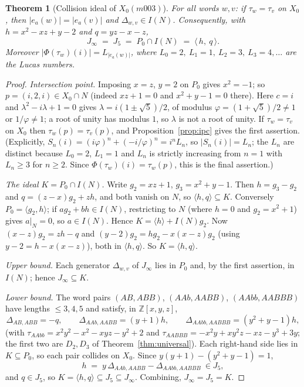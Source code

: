 \documentclass[11pt,a4paper]{article}
\newtheorem{theorem}{Theorem}[section]
\theoremstyle{definition}
\theoremstyle{remark}
\newcommand{\Z}{\mathbb{Z}}
\begin{document}
\begin{theorem}[Collision ideal of $X_0(m003)$]
\label{thm:collision}
For all words $w,v$: if $\tau_w=\tau_v$ on $X_0$, then
$|e_a(w)|=|e_a(v)|$ and $\Delta_{w,v}\in I(N)$. Consequently, with
$h=x^2-xz+y-2$ and $q=yz-x-z$,
\begin{equation}
J_\infty \;=\; J_5 \;=\; P_0\cap I(N) \;=\; \langle\, h,\ q\,\rangle .
\end{equation}
Moreover $|\Phi(\tau_w)(i)|=L_{|e_a(w)|}$, where $L_0=2,\ L_1=1,\ L_2=3,\
L_3=4,\dots$ are the Lucas numbers.
\end{theorem}

\begin{proof}
\emph{Intersection point.} Imposing $x=z$, $y=2$ on $P_0$ gives
$x^2=-1$; so $p=(i,2,i)\in X_0\cap N$ (indeed $xz+1=0$ and
$x^2+y-1=0$ there). Here $c=i$ and $\lambda^2-i\lambda+1=0$ gives
$\lambda=i(1\pm\sqrt5)/2$, of modulus $\varphi=(1+\sqrt5)/2\neq1$ or
$1/\varphi\neq1$; a root of unity has modulus $1$, so $\lambda$ is not a
root of unity. If $\tau_w=\tau_v$ on $X_0$ then $\tau_w(p)=\tau_v(p)$, and
Proposition~\ref{prop:ipc} gives the first assertion. (Explicitly,
$S_n(i)=(i\varphi)^n+(-i/\varphi)^n=i^nL_n$, so $|S_n(i)|=L_n$; the
$L_n$ are distinct because $L_0=2$, $L_1=1$ and $L_n$ is strictly
increasing from $n=1$ with $L_n\ge3$ for $n\ge2$. Since
$\Phi(\tau_w)(i)=\tau_w(p)$, this is the final assertion.)

\emph{The ideal $K=P_0\cap I(N)$.} Write $g_2=xz+1$, $g_3=x^2+y-1$.
Then $h=g_3-g_2$ and $q=(z-x)g_2+zh$, and both vanish on $N$, so
$\langle h,q\rangle\subseteq K$. Conversely $P_0=\langle g_2,h\rangle$; if
$ag_2+bh\in I(N)$, restricting to $N$ (where $h=0$ and $g_2=x^2+1$)
gives $a|_N=0$, so $a\in I(N)$. Hence
$K=\langle h\rangle+I(N)g_2$. Now $(x-z)g_2=zh-q$ and
$(y-2)g_2=hg_2-x(x-z)g_2$ (using $y-2=h-x(x-z)$), both in
$\langle h,q\rangle$. So $K=\langle h,q\rangle$.

\emph{Upper bound.} Each generator $\Delta_{w,v}$ of $J_\infty$ lies in
$P_0$ and, by the first assertion, in $I(N)$; hence $J_\infty\subseteq K$.

\emph{Lower bound.} The word pairs $(AB,ABB)$, $(AAb,AABB)$, $(AAbb,AABBB)$
have lengths $\le3,4,5$ and satisfy, in $\Z[x,y,z]$,
\begin{equation}
\Delta_{AB,ABB}=-q,\qquad
\Delta_{AAb,AABB}=(y+1)h,\qquad
\Delta_{AAbb,AABBB}=(y^2+y-1)h,
\end{equation}
(with $\tau_{AAbb}=x^2y^2-x^2-xyz-y^2+2$ and
$\tau_{AABBB}=-x^2y+xy^2z-xz-y^3+3y$; the first two are $D_2,D_3$ of
Theorem~\ref{thm:universal}). Each right-hand side lies in $K\subseteq
P_0$, so each pair collides on $X_0$. Since
$y(y+1)-(y^2+y-1)=1$,
\begin{equation}
h \;=\; y\,\Delta_{AAb,AABB}-\Delta_{AAbb,AABBB}\ \in J_5,
\end{equation}
and $q\in J_5$, so $K=\langle h,q\rangle\subseteq J_5\subseteq J_\infty$.
Combining, $J_\infty=J_5=K$.
\end{proof}
\end{document}
